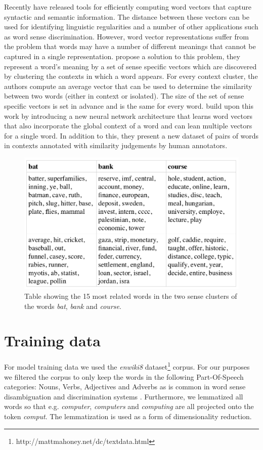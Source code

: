 \documentclass[11pt]{article}
\begin{document}
Recently \cite{word2vec} have released tools for efficiently computing word vectors that capture syntactic and semantic information. The distance between these vectors can be used for identifying linguistic regularities \cite{regularities} and a number of other applications such as word sense discrimination. However, word vector representations suffer from the problem that words may have a number of different meanings that cannot be captured in a single representation. \cite{multi} propose a solution to this problem, they represent a word's meaning by a set of sense specific vectors which are discovered by clustering the contexts in which a word appears. For every context cluster, the authors compute an average vector that can be used to determine the similarity between two words (either in context or isolated). The size of the set of sense specific vectors is set in advance and is the same for every word. \cite{global} build upon this work by introducing a new neural network architecture that learns word vectors that also incorporate the global context of a word and can lean multiple vectors for a single word. In addition to this, they present a new dataset of pairs of words in contexts annotated with similarity judgements by human annotators. 

\begin{figure}
\center
\includegraphics[scale=0.35]{images/cocores.png}
\caption{Table showing the 15 most related words in the two sense clusters of the words \textit{bat}, \textit{bank} and \textit{course}. }
\label{coconutres}
\end{figure}

\section{Training data}
For model training data we used the \textit{enwiki8} dataset\footnote{http://mattmahoney.net/dc/textdata.html} corpus. For our purposes we filtered the corpus to only keep the words in the following Part-Of-Speech categories: Nouns, Verbs, Adjectives and Adverbs as is common in word sense disambiguation and discrimination systems \cite{survey}. Furthermore, we lemmatized all words so that e.g. \textit{computer}, \textit{computers} and \textit{computing} are all projected onto the token \textit{comput}. The lemmatization is used as a form of dimensionality reduction.
\end{document}
